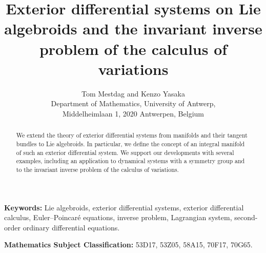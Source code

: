 \documentclass[11pt]{article}
\theoremstyle{plain}
\theoremstyle{definition}
\begin{document}
\title{Exterior differential systems on Lie algebroids  and the invariant inverse problem of the calculus of variations}


\author{Tom Mestdag and Kenzo Yasaka\\[2mm]
	{\small Department of Mathematics,  University of Antwerp,}\\
	{\small Middelheimlaan 1, 2020 Antwerpen, Belgium}
}

\date{}

\maketitle


\begin{abstract}
We extend the theory of exterior differential systems from manifolds and their tangent bundles to Lie algebroids. In particular, we define the concept of an integral manifold of such an exterior differential system. We support our developments with several examples, including an application to dynamical systems with a symmetry group and to the invariant inverse problem of the calculus of variations.
\end{abstract}

\vspace{3mm}

\textbf{Keywords:} Lie algebroids, exterior differential systems, exterior differential calculus, Euler--Poincar{\'e} equations, inverse problem, Lagrangian system, second-order ordinary differential equations.
\vspace{3mm}

\textbf{Mathematics Subject Classification:} 
53D17,
53Z05,
58A15,
70F17,
70G65.


\end{document}
